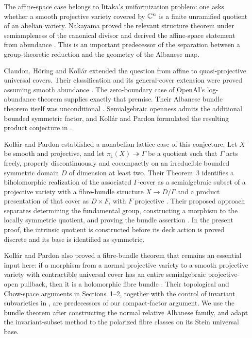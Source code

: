 The affine-space case belongs to Iitaka's uniformization problem:
one asks whether a smooth projective variety covered by \(\mathbb C^n\)
is a finite unramified quotient of an abelian variety.
Nakayama proved the relevant structure theorem under semiampleness
of the canonical divisor and derived the affine-space statement
from abundance \cite[Theorem~1.4]{Nakayama1999}. This is an important
predecessor of the separation between a group-theoretic reduction
and the geometry of the Albanese map.

Claudon, H\"oring and Koll\'ar extended the question from affine
to quasi-projective universal covers. Their classification and its
general-cover extension were proved assuming smooth abundance
\cite[Theorem~1.1, Conjecture~1.2 and Corollary~1.5]{ClaudonHoeringKollar2013}.
The zero-boundary case of OpenAI's log-abundance theorem
\cite[Theorem~1.1]{OpenAILogAbundance2026} supplies exactly that
premise. Their Albanese bundle theorem itself was unconditional
\cite[Theorem~1.4]{ClaudonHoeringKollar2013}.
Semialgebraic openness admits the additional bounded symmetric
factor, and Koll\'ar and Pardon formulated the resulting product
conjecture in \cite[Conjecture~2]{KollarPardon2012}.

Koll\'ar and Pardon established a nonabelian lattice case of this
conjecture. Let \(X\) be smooth and projective, and let
\(\pi_1(X)\twoheadrightarrow\Gamma\) be a quotient such that
\(\Gamma\) acts freely, properly discontinuously and cocompactly on
an irreducible bounded symmetric domain \(D\) of dimension at least
two. Their Theorem~3 identifies a biholomorphic realization of the
associated \(\Gamma\)-cover as a semialgebraic subset of a projective
variety with a fibre-bundle structure \(X\to D/\Gamma\) and a product
presentation of that cover as \(D\times F\), with \(F\) projective
\cite[Theorem~3]{KollarPardon2012}.
Their proposed approach separates determining the fundamental group,
constructing a morphism to the locally symmetric quotient, and
proving the bundle assertion \cite[\S3]{KollarPardon2012}.
In the present proof, the intrinsic quotient is constructed before
its deck action is proved discrete and its base is identified as
symmetric.

Koll\'ar and Pardon also proved a fibre-bundle theorem that remains
an essential input here: if a morphism from a normal projective
variety to a smooth projective variety with contractible universal
cover has an entire semialgebraic projective-open pullback, then
it is a holomorphic fibre bundle
\cite[arXiv version~2, Theorem~20]{KollarPardon2012}.
Their topological and Chow-space arguments in Sections~1--2,
together with the control of invariant subvarieties in
\cite[Section~2]{ClaudonHoeringKollar2013}, are predecessors of our
compact-factor argument. We use the bundle theorem after constructing
the normal relative Albanese family, and adapt the invariant-subset
method to the polarized fibre classes on its Stein universal base.

